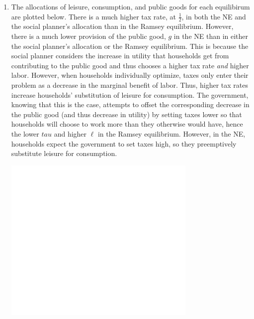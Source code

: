 \documentclass{article}
\begin{document}
\begin{enumerate}
	\item The allocations of leisure, consumption, and public goods for each equilibirum are plotted below. There is a much higher tax rate, at $\frac{1}{2}$, in both the NE and the social planner's allocation than in the Ramsey equilibrium. However, there is a much lower provision of the public good, $g$ in the NE than in either the social planner's allocation or the Ramsey equilibrium. This is because the social planner considers the increase in utility that households get from contributing to the public good and thus chooses a higher tax rate \textit{and} higher labor. However, when households individually optimize, taxes only enter their problem as a decrease in the marginal benefit of labor. Thus, higher tax rates increase households' substitution of leisure for consumption. The government, knowing that this is the case, attempts to offset the corresponding decrease in the public good (and thus decrease in utility) by setting taxes lower so that households will choose to work more than they otherwise would have, hence the lower $tau$ and higher $\ell$ in the Ramsey equilibrium. However, in the NE, households expect the government to set taxes high, so they preemptively substitute leisure for consumption.
		\begin{center}
			\includegraphics[scale=1]{figure2.png}
		\end{center}
	

\end{enumerate}
\end{document}
